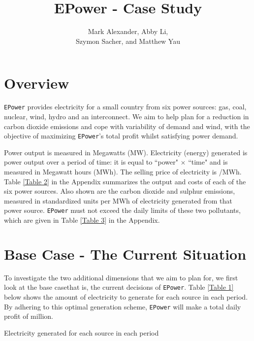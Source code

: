 \documentclass{article}
\title{\Huge EPower - Case Study}
\author{Mark Alexander, Abby Li,\\Szymon Sacher, and Matthew Yau}
\begin{document}
	\begin{titlepage}

	\maketitle
    
    \end{titlepage}
    
    \section{Overview}
    
    \texttt{EPower} provides electricity for a small country from six power sources: gas, coal, nuclear, wind, hydro and an interconnect. We aim to help plan for a reduction in carbon dioxide emissions and cope with variability of demand and wind, with the objective of maximizing \texttt{EPower}'s total profit whilst satisfying power demand.

    Power output is measured in Megawatts (MW). Electricity (energy) generated is power output over a period of time: it is equal to ``power" $\times$ ``time" and is measured in Megawatt hours (MWh). The selling price of electricity is /MWh. Table \ref{Table 2} in the Appendix summarizes the output and costs of each of the six power sources. Also shown are the carbon dioxide and sulphur emissions, measured in standardized units per MWh of electricity generated from that power source. \texttt{EPower} must not exceed the daily limits of these two pollutants, which are given in Table \ref{Table 3} in the Appendix.
       
    \section{Base Case - The Current Situation}
	
    To investigate the two additional dimensions that we aim to plan for, we first look at the base case\textemdash that is, the current decisions of \texttt{EPower}. Table \ref{Table 1} below shows the amount of electricity to generate for each source in each period. By adhering to this optimal generation scheme, \texttt{EPower} will make a total daily profit of  million.
    
    \begin{table}[H]
    	\centering
    	\caption{Electricity generated for each source in each period\label{Table 1}}
    \end{table}
    
\end{document}
